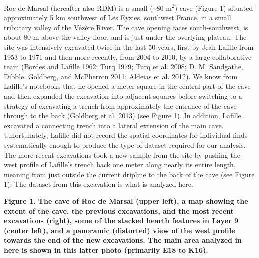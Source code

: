 \documentclass[smallextended]{svjour3}       %
\begin{document}
Roc de Marsal (hereafter also RDM) is a small (\textasciitilde{}80
m\textsuperscript{2}) cave (Figure 1) situated approximately 5 km
southwest of Les Eyzies, southwest France, in a small tributary valley
of the Vézère River. The cave opening faces south-southwest, is about 80
m above the valley floor, and is just under the overlying plateau. The
site was intensively excavated twice in the last 50 years, first by Jean
Lafille from 1953 to 1971 and then more recently, from 2004 to 2010, by
a large collaborative team (Bordes and Lafille 1962; Turq 1979; Turq et
al. 2008; D. M. Sandgathe, Dibble, Goldberg, and McPherron 2011; Aldeias
et al. 2012). We know from Lafille's notebooks that he opened a meter
square in the central part of the cave and then expanded the excavation
into adjacent squares before switching to a strategy of excavating a
trench from approximately the entrance of the cave through to the back
(Goldberg et al. 2013) (see Figure 1). In addition, Lafille excavated a
connecting trench into a lateral extension of the main cave.
Unfortunately, Lafille did not record the spatial coordinates for
individual finds systematically enough to produce the type of dataset
required for our analysis. The more recent excavations took a new sample
from the site by pushing the west profile of Lafille's trench back one
meter along nearly its entire length, meaning from just outside the
current dripline to the back of the cave (see Figure 1). The dataset
from this excavation is what is analyzed here.

\textbf{Figure 1. The cave of Roc de Marsal (upper left), a map showing
the extent of the cave, the previous excavations, and the most recent
excavations (right), some of the stacked hearth features in Layer 9
(center left), and a panoramic (distorted) view of the west profile
towards the end of the new excavations. The main area analyzed in here
is shown in this latter photo (primarily E18 to K16).}
\end{document}
